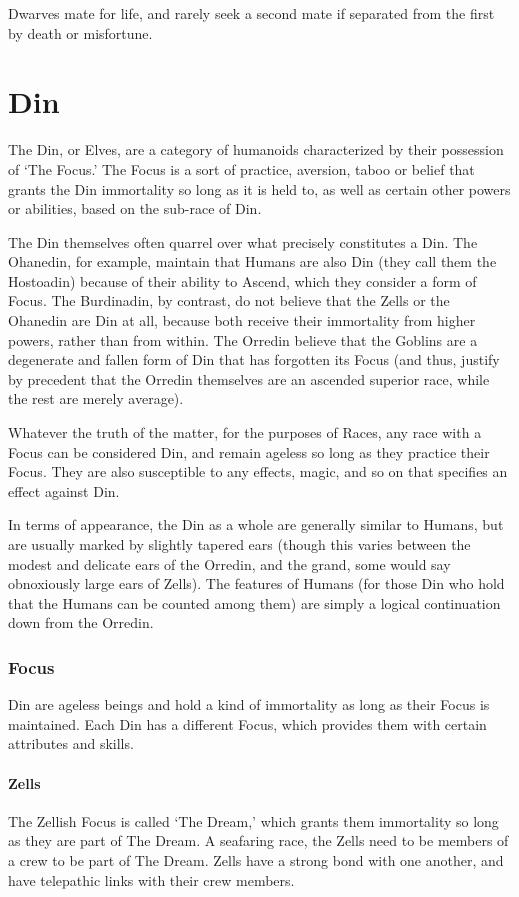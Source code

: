 \documentclass[oneside,11pt,english]{book}
\begin{document}
 
Dwarves mate for life, and rarely seek a second mate if separated from the first by death or misfortune. 
\section{Din}%
The Din, or Elves, are a category of humanoids characterized by their possession of ‘The Focus.’ The 
Focus is a sort of practice, aversion, taboo or belief that grants the Din immortality so long as it is held to, 
as well as certain other powers or abilities, based on the sub-race of Din. 


The Din themselves often quarrel over what precisely constitutes a Din. The Ohanedin, for example, maintain that Humans are also Din (they call them the Hostoadin) because of their ability to Ascend, which they consider a form of Focus. The Burdinadin, by contrast, do not believe that the Zells or the Ohanedin are Din at all, because both receive their immortality from higher powers, rather than from within. The Orredin believe that the Goblins are a degenerate and fallen form of Din that has forgotten its Focus (and thus, justify by precedent that the Orredin themselves are an ascended superior race, while the rest are merely average). 


Whatever the truth of the matter, for the purposes of Races, any race with a Focus can be considered Din, and remain ageless so long as they practice their Focus. They are also susceptible to any effects, magic, and so on that specifies an effect against Din.


In terms of appearance, the Din as a whole are generally similar to Humans, but are usually marked by slightly tapered ears (though this varies between the modest and delicate ears of the Orredin, and the grand, some would say obnoxiously large ears of Zells). The features of Humans (for those Din who hold that the Humans can be counted among them) are simply a logical continuation down from the Orredin.


\subsubsection{Focus}
Din are ageless beings and hold a kind of immortality as long as their Focus is maintained. Each Din has a different Focus, which provides them with certain attributes and skills.


\paragraph*{Zells}
The Zellish Focus is called ‘The Dream,’ which grants them immortality so long as they are part of The Dream. A seafaring race, the Zells need to be members of a crew to be part of The Dream. Zells have a strong bond with one another, and have telepathic links with their crew members.
\end{document}
